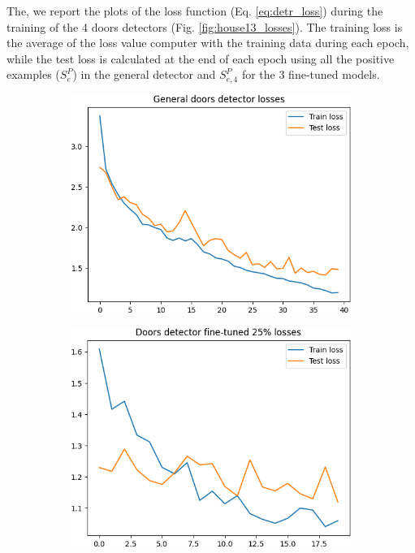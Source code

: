 The, we report the plots of the loss function (Eq. \ref{eq:detr_loss}) during the training of the 4 doors detectors (Fig. \ref{fig:house13_losses}). The training loss is the average of the loss value computer with the training data during each epoch, while the test loss is calculated at the end of each epoch using all the positive examples ($S^{P}_e$) in the general detector and  $S^{P}_{e,4}$ for the 3 fine-tuned models.

\begin{figure}[h!]
	\begin{subfigure}[b]{0.49\linewidth}
		\includegraphics[width=\linewidth]{images/house13_general_detector_loss.png}

	\end{subfigure}
	\hfil
	\begin{subfigure}[b]{0.49\linewidth}
		\includegraphics[width=\linewidth]{images/house13_finetune25_loss.png}


\end{subfigure}
\end{figure}
